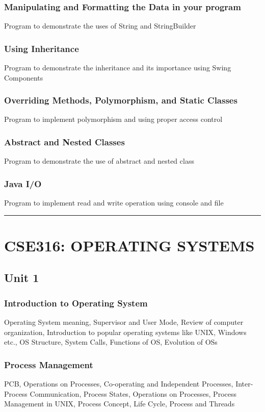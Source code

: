 \documentclass{article}
\begin{document}
\begin{multicols*}{2}
    \subsubsection*{Manipulating and Formatting the Data in your program}
    Program to demonstrate the uses of String and StringBuilder
    \subsubsection*{Using Inheritance}
    Program to demonstrate the inheritance and its importance using Swing Components
    \subsubsection*{Overriding Methods, Polymorphism, and Static Classes}
    Program to implement polymorphism and using proper access control
    \subsubsection*{Abstract and Nested Classes}
    Program to demonstrate the use of abstract and nested class
    \subsubsection*{Java I/O}
    Program to implement read and write operation using console and file \\
    \hrule
    \section*{CSE316: OPERATING SYSTEMS}
    \subsection*{Unit 1}
    \subsubsection*{Introduction to Operating System}
    Operating System meaning, Supervisor and User Mode, Review of computer organization, Introduction to popular operating systems like UNIX, Windows etc., OS Structure, System Calls, Functions of OS, Evolution of OSs
    \subsubsection*{Process Management}
    PCB, Operations on Processes, Co-operating and Independent Processes, Inter-Process Communication, Process States, Operations on Processes, Process Management in UNIX, Process Concept, Life Cycle, Process and Threads

\end{multicols*}
\end{document}
